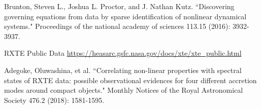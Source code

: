 \documentclass[10pt,conference]{IEEEtran}
\begin{document}
\begin{thebibliography}{1}
 Brunton, Steven L., Joshua L. Proctor, and J. Nathan Kutz. ``Discovering governing equations from data by sparse identification of nonlinear dynamical systems." Proceedings of the national academy of sciences 113.15 (2016): 3932-3937.

  RXTE Public Data \url{https://heasarc.gsfc.nasa.gov/docs/xte/xte_public.html}

Adegoke, Oluwashina, et al. ``Correlating non-linear properties with spectral states of RXTE data: possible observational evidences for four different accretion modes around compact objects." Monthly Notices of the Royal Astronomical Society 476.2 (2018): 1581-1595.

\end{thebibliography}

\end{document}
